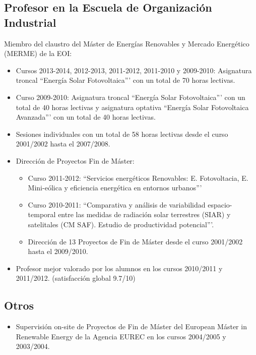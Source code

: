 \documentclass[article, a4paper]{memoir}
\begin{document}
\subsection{Profesor en la Escuela de Organización Industrial}
\label{sec-3-2}

Miembro del claustro del Máster de Energías Renovables y Mercado Energético (MERME) de la EOI:

\begin{itemize}
\item Cursos 2013-2014, 2012-2013, 2011-2012, 2011-2010 y 2009-2010:
Asignatura troncal ``Energía Solar Fotovoltaica''' con un total de 70
horas lectivas.

\item Curso 2009-2010: Asignatura troncal ``Energía Solar Fotovoltaica'''
con un total de 40 horas lectivas y asignatura optativa ``Energía
Solar Fotovoltaica Avanzada''' con un total de 40 horas lectivas.

\item Sesiones individuales con un total de 58 horas lectivas desde el
curso 2001/2002 hasta el 2007/2008.

\item Dirección de Proyectos Fin de Máster:

\begin{itemize}
\item Curso 2011-2012: ``Servicios energéticos Renovables:
E. Fotovoltacia, E. Mini-eólica y eficiencia energética en
entornos urbanos'''
\item Curso 2010-2011: ``Comparativa y análisis de variabilidad
espacio-temporal entre las medidas de radiación solar terrestres
(SIAR) y satelitales (CM SAF). Estudio de productividad
potencial'''.
\item Dirección de 13 Proyectos de Fin de Máster desde el curso
2001/2002 hasta el 2009/2010.
\end{itemize}

\item Profesor mejor valorado por los alumnos en los cursos 2010/2011
y 2011/2012. (satisfacción global 9.7/10)
\end{itemize}

\subsection{Otros}
\label{sec-3-3}

\begin{itemize}
\item Supervisión on-site de Proyectos de Fin de Máster del European
Máster in Renewable Energy de la Agencia EUREC en los cursos
2004/2005 y 2003/2004.
\end{itemize}
\end{document}
